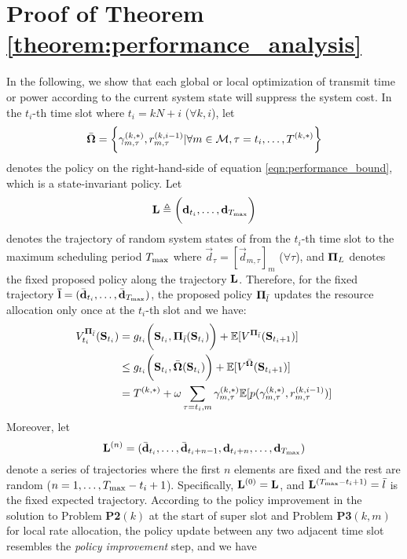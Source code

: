\section{ Proof of Theorem \ref{theorem:performance_analysis} }
\label{append_3}
In the following, we show that each global or local optimization of transmit time or power according to the current system state will suppress the system cost.
In the $t_i$-th time slot where $t_i=kN+i$ ($\forall k,i$),
let 
\begin{align*}
    \bar{\boldsymbol{\Omega}} = \bigg\{ \gamma^{(k,*)}_{m,\tau}, r^{(k,i-1)}_{m,\tau} | \forall m\in\mathcal{M}, \tau=t_i,\dots,T^{(k,*)} \bigg\}
\end{align*}
denotes the policy on the right-hand-side of equation \eqref{eqn:performance_bound}, which is a state-invariant policy.
Let
\begin{align*}
    \mathbf{L} \triangleq \bigg( \mathbf{d}_{t_i}, \dots, \mathbf{d}_{{T_{\max}}} \bigg)
\end{align*}
denotes the trajectory of random system states of {\IAVs} from the $t_i$-th time slot to the maximum scheduling period ${T_{\max}}$ where $\vec{d}_{\tau} = [ \vec{d}_{m,\tau} ]_m$ ($\forall \tau$),
and $\mathbf{\Pi}_{L}$ denotes the fixed proposed policy along the trajectory $\mathbf{L}$.
Therefore, for the fixed trajectory $\mathbf{\bar{l}} = ( \bar{\mathbf{d}}_{t_i}, \dots, \bar{\mathbf{d}}_{{T_{\max}}} )$, the proposed policy $\mathbf{\Pi}_{\bar{l}}$ updates the resource allocation only once at the $t_i$-th slot and we have:
\begin{align*}
    V^{\mathbf{\Pi}_{\bar{l}}}_{t_i}( \mathbf{S}_{t_i} ) &= g_{t_i}\bigg( \mathbf{S}_{t_i}, \mathbf{\Pi}_{\bar{l}}(\mathbf{S}_{t_i}) \bigg) + \mathbb{E}[ V^{ \mathbf{\Pi}_{\bar{l}} }( \mathbf{S}_{t_i+1} ) ]
    \nonumber\\
    &\leq g_{t_i}\bigg( \mathbf{S}_{t_i}, \bar{\boldsymbol{\Omega}}(\mathbf{S}_{t_i}) \bigg) + \mathbb{E}[ V^{ \bar{\boldsymbol{\Omega}} }( \mathbf{S}_{t_i+1} ) ]
    \nonumber\\
    &= T^{(k,*)} + \omega \sum_{\tau=t_i, m} \gamma^{(k,*)}_{m,\tau} \mathbb{E}[ p( \gamma^{(k,*)}_{m,\tau}, r^{(k,i-1)}_{m,\tau} ) ]
\end{align*}
Moreover, let
$$
\mathbf{L}^{(n)} = ( \bar{\mathbf{d}}_{t_i}, \dots, \bar{\mathbf{d}}_{t_i+n-1}, \mathbf{d}_{t_i+n}, \dots,  \mathbf{d}_{{T_{\max}}})
$$
denote a series of trajectories where the first $n$ elements are fixed and the rest are random ($n=1,\dots,{T_{\max}}-t_i+1$).
Specifically, $\mathbf{L}^{(0)} = \mathbf{L}$, and $\mathbf{L}^{({T_{\max}}-t_i+1)} = \bar{l}$ is the fixed expected trajectory.
According to the policy improvement in the solution to Problem \textbf{P2$(k)$} at the start of super slot and Problem \textbf{P3$(k,m)$} for local rate allocation, the policy update between any two adjacent time slot resembles the \emph{policy improvement} step, and we have
